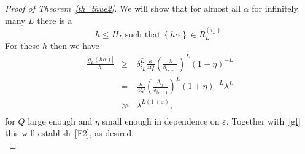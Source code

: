 \documentclass[12pt]{amsart}
\newcommand {\ve} {\varepsilon}
\begin{document}
\begin{proof}[Proof of Theorem~\ref{th_thue2}]
We will show that for almost all $\alpha$ for infinitely many $L$ there is a
\begin{equation} \label{F10}
h \leq H_L~\mbox{such that}~\left\{h \alpha\right\} \in R_{L}^{(i_L)}.
\end{equation}
For these $h$ then we have
\begin{eqnarray*}
\frac{|g_{L}(h \alpha)|}{h} & \geq & \delta_{i_L}^{L} \frac{\kappa}{4 Q} \left(\frac{\lambda}{\delta_{i_L+1}}\right)^{L} (1+\eta)^{-L} \\
& = & \frac{\kappa}{4 Q} \left(\frac{\delta_{i_L}}{\delta_{i_L+1}}\right)^{L}  (1+\eta)^{-L} \lambda^{L} \\
& \gg & \lambda^{L(1+\ve)}, \\
\end{eqnarray*} 
for $Q$ large enough and $\eta$ small enough in dependence on $\ve$. Together with~\eqref{gf} this will establish~\eqref{F2}, as desired.\\


\end{proof}
\end{document}
